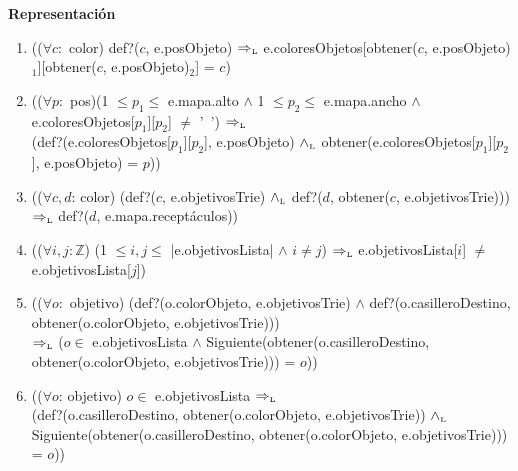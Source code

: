 \documentclass[a4paper,10pt]{article}
\newenvironment{Representacion}{%
  \vspace*{2ex}%
  \noindent\textbf{\Large Representación}%
  \vspace*{2ex}%
}{}
\begin{document}
\begin{Representacion}
\begin{enumerate}
      \item (($\forall c:$ color) def?($c$, e.posObjeto) $\Rightarrow_{\mathrm{\scriptscriptstyle{L}}}$ e.coloresObjetos[obtener($c$, e.posObjeto)$_{1}$][obtener($c$, e.posObjeto)$_{2}$] = $c$)
      
      \item (($\forall p:$ pos)(1 $\leq p_{1} \leq$ e.mapa.alto $\land$ 1 $\leq p_{2} \leq$ e.mapa.ancho $\land$
      e.coloresObjetos[$p_{1}$][$p_{2}$] $\neq$ '\ ') $\Rightarrow_{\mathrm{\scriptscriptstyle{L}}}$ \\
      (def?(e.coloresObjetos[$p_{1}$][$p_{2}$], e.posObjeto) $\land_{\mathrm{\scriptscriptstyle{L}}}$ obtener(e.coloresObjetos[$p_{1}$][$p_{2}$], e.posObjeto) = $p$))
      
      \item (($\forall c, d$: color) (def?($c$, e.objetivosTrie) $\land_{\mathrm{\scriptscriptstyle{L}}}$ def?($d$, obtener($c$, e.objetivosTrie))) $\Rightarrow_{\mathrm{\scriptscriptstyle{L}}}$ def?($d$, e.mapa.receptáculos))
      
      \item (($\forall i,j: \mathbb  Z$) (1 $\leq i,j \leq$ |e.objetivosLista| $\land$ $i \neq j$) $\Rightarrow_{\mathrm{\scriptscriptstyle{L}}}$ 
      e.objetivosLista[$i$] $\neq$ e.objetivosLista[$j$])
      
      \item (($\forall o:$ objetivo) (def?(o.colorObjeto, e.objetivosTrie) $\land$ def?(o.casilleroDestino, obtener(o.colorObjeto, e.objetivosTrie))) \\ 
      $\Rightarrow_{\mathrm{\scriptscriptstyle{L}}}$ ($o \in$ e.objetivosLista $\land$ Siguiente(obtener(o.casilleroDestino, obtener(o.colorObjeto, e.objetivosTrie))) = $o$))
      
      \item (($\forall o$: objetivo) $o \in$ e.objetivosLista $\Rightarrow_{\mathrm{\scriptscriptstyle{L}}}$ \\
      (def?(o.casilleroDestino, obtener(o.colorObjeto, e.objetivosTrie)) $\land_{\mathrm{\scriptscriptstyle{L}}}$ Siguiente(obtener(o.casilleroDestino, obtener(o.colorObjeto, e.objetivosTrie))) = $o$))
  \end{enumerate}


  ~


\end{Representacion}
\end{document}
